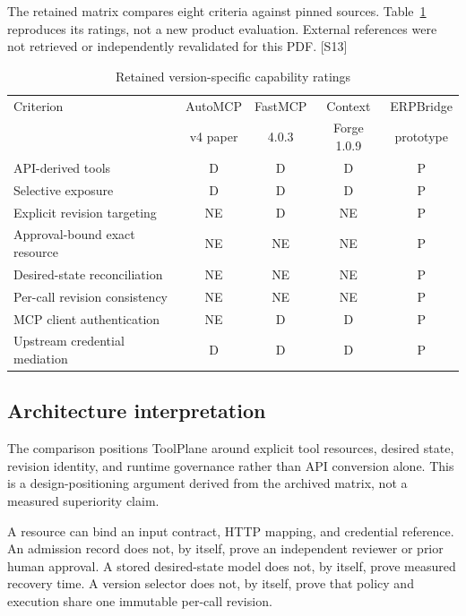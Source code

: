 The retained matrix compares eight criteria against pinned sources. Table~\ref{tab:comparison} reproduces its ratings, not a new product evaluation. External references were not retrieved or independently revalidated for this PDF. [S13]

\begin{table}[h]\caption{Retained version-specific capability ratings}\label{tab:comparison}\EvidenceTableStart
\begin{tabularx}{\linewidth}{@{}Xcccc@{}}\toprule
Criterion & AutoMCP & FastMCP & Context & ERPBridge\\
 & v4 paper & 4.0.3 & Forge 1.0.9 & prototype\\\midrule
API-derived tools & D & D & D & P\\
Selective exposure & D & D & D & P\\
Explicit revision targeting & NE & D & NE & P\\
Approval-bound exact resource & NE & NE & NE & P\\
Desired-state reconciliation & NE & NE & NE & P\\
Per-call revision consistency & NE & NE & NE & P\\
MCP client authentication & NE & D & D & P\\
Upstream credential mediation & D & D & D & P\\\bottomrule
\end{tabularx}\end{table}


\subsection*{Architecture interpretation}
The comparison positions ToolPlane around explicit tool resources, desired state, revision identity, and runtime governance rather than API conversion alone. This is a design-positioning argument derived from the archived matrix, not a measured superiority claim.

A resource can bind an input contract, HTTP mapping, and credential reference. An admission record does not, by itself, prove an independent reviewer or prior human approval. A stored desired-state model does not, by itself, prove measured recovery time. A version selector does not, by itself, prove that policy and execution share one immutable per-call revision.

